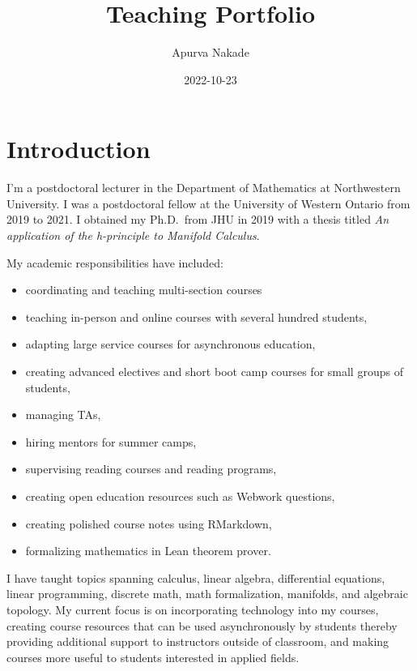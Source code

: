 \documentclass[
]{report}
\title{Teaching Portfolio}
\author{Apurva Nakade}
\date{2022-10-23}
\providecommand{\tightlist}{%
  \setlength{\itemsep}{0pt}\setlength{\parskip}{0pt}}
\begin{document}
\maketitle

\thispagestyle{empty}

{
\setcounter{tocdepth}{2}
\tableofcontents
}
\hypertarget{introduction}{%
\chapter*{Introduction}\label{introduction}}


I'm a postdoctoral lecturer in the Department of Mathematics at Northwestern
University. I was a postdoctoral fellow at the University of Western
Ontario from 2019 to 2021. I obtained my Ph.D.~from JHU in 2019 with a thesis titled \emph{An application of
the h-principle to Manifold Calculus}.

My academic responsibilities have included:

\begin{itemize}
\tightlist
\item
  coordinating and teaching multi-section courses
\item
  teaching in-person and online courses with several hundred students,
\item
  adapting large service courses for asynchronous education,
\item
  creating advanced electives and short boot camp courses for small groups of students,
\item
  managing TAs,
\item
  hiring mentors for summer camps,
\item
  supervising reading courses and reading programs,
\item
  creating open education resources such as Webwork questions,
\item
  creating polished course notes using RMarkdown,
\item
  formalizing mathematics in Lean theorem prover.
\end{itemize}

I have taught topics spanning calculus, linear algebra, differential equations, linear programming, discrete math, math formalization, manifolds, and algebraic topology.
My current focus is on incorporating technology into my courses, creating course resources that can be used asynchronously by students thereby providing additional support to instructors outside of classroom, and making courses more useful to students interested in applied fields.
\end{document}

